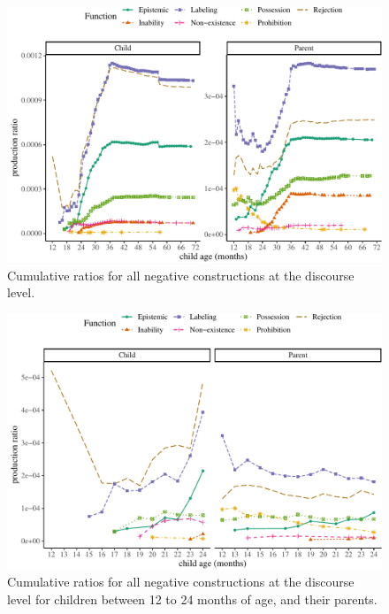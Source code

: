 \documentclass[
  english,
  man,floatsintext]{apa6}
\begin{document}
\begin{figure}[H]

{\centering \includegraphics{neg_construction_article_files/figure-latex/alldiscourse-1} 

}

\caption{Cumulative ratios for all negative constructions at the discourse level.}\label{fig:alldiscourse}
\end{figure}

\begin{figure}[H]

{\centering \includegraphics{neg_construction_article_files/figure-latex/alldiscoursebegin-1} 

}

\caption{Cumulative ratios for all negative constructions at the discourse level for children between 12 to 24 months of age, and their parents.}\label{fig:alldiscoursebegin}
\end{figure}
\end{document}
